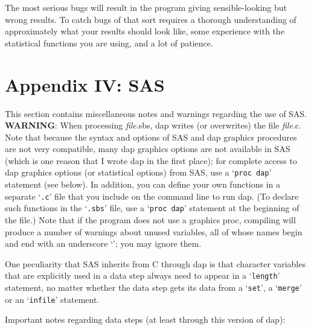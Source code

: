 \documentclass{book}
\newcommand\Texinfocommandstyletextvar[1]{{\normalfont{}\textsl{#1}}}%
\renewcommand{\_}{\Texinfounderscore\discretionary{}{}{}}
\begin{document}
The most serious bugs will result in the program giving sensible-looking
but wrong results.
To catch bugs of that sort requires a thorough understanding of
approximately what your results should look like, some experience
with the statistical functions you are using, and a lot of patience.

\chapter*{{Appendix IV: SAS}}
\label{anchor:Appendix-IV}%

%
%
This section contains miscellaneous notes and warnings regarding
the use of SAS.
\textbf{WARNING}:
When processing \Texinfocommandstyletextvar{file}.sbs, dap writes (or overwrites)
the file \Texinfocommandstyletextvar{file}.c. Note that because the syntax
and options of SAS and dap graphics procedures are not very compatible,
many dap graphics options are not available in SAS (which is one reason
that I wrote dap in the first place); for complete access
to dap graphics options (or statistical options) from SAS,
use a `\texttt{proc dap}' statement (see below).
In addition, you can define your own functions in a separate `\texttt{.c}' file
that you include on the command line to run dap. (To declare such functions
in the `\texttt{.sbs}' file, use a `\texttt{proc dap}' statement at the beginning
of the file.)
Note that if the program does not use a graphics proc,
compiling will produce a number of warnings about unused variables, all of whose
names begin and end with an underscore `\texttt{\_}'; you may ignore them.

One peculiarity that SAS inherits from C through dap
is that character variables that are explicitly
used in a data step always need to appear in a `\texttt{length}' statement,
no matter whether the data step gets its data from a
`\texttt{set}', a `\texttt{merge}' or an `\texttt{infile}' statement.

Important notes regarding data steps (at least through this version of dap):
\end{document}
